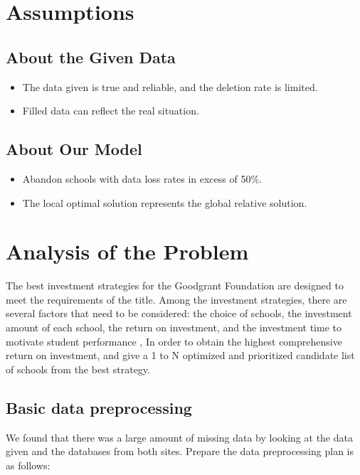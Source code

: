 \documentclass{mcmthesis}
\begin{document}
\section{Assumptions}

\subsection{About the Given Data}

\begin{itemize}
	\item The data given is true and reliable, and the deletion rate is limited.
	\item Filled data can reflect the real situation.
\end{itemize}

\subsection{About Our Model}

\begin{itemize}
	\item Abandon schools with data loss rates in excess of 50\%.
	\item The local optimal solution represents the global relative solution.
\end{itemize}


\section{Analysis of the Problem}

The best investment strategies for the Goodgrant Foundation are designed to meet the requirements of the title. Among the investment strategies, there are several factors that need to be considered: the choice of schools, the investment amount of each school, the return on investment, and the investment time to motivate student performance , In order to obtain the highest comprehensive return on investment, and give a 1 to N optimized and prioritized candidate list of schools from the best strategy.

\subsection{Basic data preprocessing}

\par We found that there was a large amount of missing data by looking at the data given and the databases from both sites. Prepare the data preprocessing plan is as follows:
\end{document}
